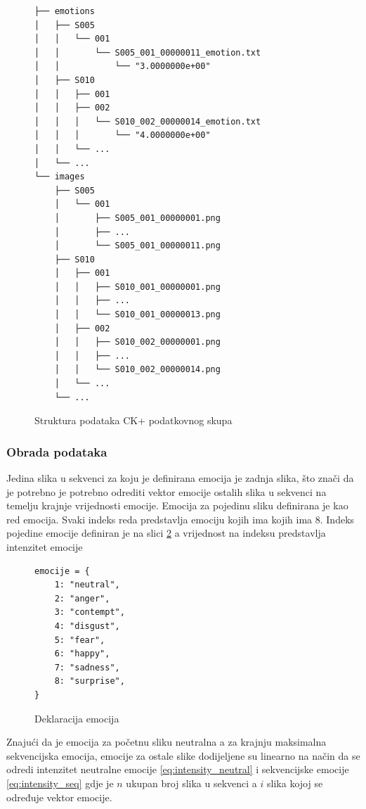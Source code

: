 \documentclass[times, utf8, zavrsni,numeric]{fer}
\begin{document}
\begin{figure}[H]
\centering
\begin{Verbatim}[fontsize=\small]
├── emotions
│   ├── S005
│   │   └── 001
│   │       └── S005_001_00000011_emotion.txt
│   │       	└── "3.0000000e+00"
│   ├── S010
│   │   ├── 001
│   │   ├── 002
│   │   │   └── S010_002_00000014_emotion.txt
│   │   │   	└── "4.0000000e+00"
│   │   └── ...
│   └── ...
└── images
    ├── S005
    │   └── 001
    │       ├── S005_001_00000001.png
    │       ├── ...
    │       └── S005_001_00000011.png
    ├── S010
    │   ├── 001
    │   │   ├── S010_001_00000001.png
    │   │   ├── ...
    │   │   └── S010_001_00000013.png
    │   ├── 002
    │   │   ├── S010_002_00000001.png
    │   │   ├── ...
    │   │   └── S010_002_00000014.png
    │   └── ...
    └── ...

\end{Verbatim}
\caption{Struktura podataka CK+ podatkovnog skupa}
\label{cb:npy_tree}
\end{figure}

\subsubsection{Obrada podataka}
Jedina slika u sekvenci za koju je definirana emocija je zadnja slika, što znači da je potrebno je potrebno odrediti vektor emocije ostalih slika u sekvenci na temelju krajnje vrijednosti emocije. Emocija za pojedinu sliku definirana je kao red emocija. Svaki indeks reda predstavlja emociju kojih ima kojih ima 8. Indeks pojedine emocije definiran je na slici \ref{cb:emo_declare} a vrijednost na indeksu predstavlja intenzitet emocije

\begin{figure}[H]
\centering
\begin{Verbatim}[fontsize=\small]
emocije = {
    1: "neutral",
    2: "anger",
    3: "contempt",
    4: "disgust",
    5: "fear",
    6: "happy",
    7: "sadness",
    8: "surprise",
}
\end{Verbatim}
\caption{Deklaracija emocija}
\label{cb:emo_declare}
\end{figure}

\noindent
Znajući da je emocija za početnu sliku neutralna a za krajnju maksimalna sekvencijska emocija, emocije za ostale slike dodijeljene su linearno na način da se odredi intenzitet neutralne emocije \ref{eq:intensity_neutral} i sekvencijske emocije \ref{eq:intensity_seq} gdje je $n$ ukupan broj slika u sekvenci a $i$ slika kojoj se određuje vektor emocije.
\end{document}
